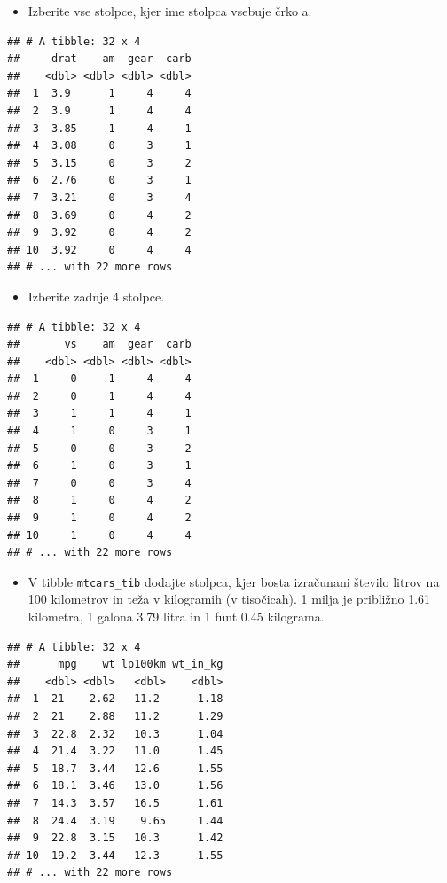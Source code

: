 \documentclass[
]{book}
\providecommand{\tightlist}{%
  \setlength{\itemsep}{0pt}\setlength{\parskip}{0pt}}
\begin{document}
\begin{enumerate}
  \begin{itemize}
  \tightlist
  \item
    Izberite vse stolpce, kjer ime stolpca vsebuje črko a.
  \end{itemize}

\begin{verbatim}
## # A tibble: 32 x 4
##     drat    am  gear  carb
##    <dbl> <dbl> <dbl> <dbl>
##  1  3.9      1     4     4
##  2  3.9      1     4     4
##  3  3.85     1     4     1
##  4  3.08     0     3     1
##  5  3.15     0     3     2
##  6  2.76     0     3     1
##  7  3.21     0     3     4
##  8  3.69     0     4     2
##  9  3.92     0     4     2
## 10  3.92     0     4     4
## # ... with 22 more rows
\end{verbatim}

  \begin{itemize}
  \tightlist
  \item
    Izberite zadnje 4 stolpce.
  \end{itemize}

\begin{verbatim}
## # A tibble: 32 x 4
##       vs    am  gear  carb
##    <dbl> <dbl> <dbl> <dbl>
##  1     0     1     4     4
##  2     0     1     4     4
##  3     1     1     4     1
##  4     1     0     3     1
##  5     0     0     3     2
##  6     1     0     3     1
##  7     0     0     3     4
##  8     1     0     4     2
##  9     1     0     4     2
## 10     1     0     4     4
## # ... with 22 more rows
\end{verbatim}

  \begin{itemize}
  \tightlist
  \item
    V tibble \texttt{mtcars\_tib} dodajte stolpca, kjer bosta izračunani število litrov na 100 kilometrov in teža v kilogramih (v tisočicah). 1 milja je približno 1.61 kilometra, 1 galona 3.79 litra in 1 funt 0.45 kilograma.
  \end{itemize}

\begin{verbatim}
## # A tibble: 32 x 4
##      mpg    wt lp100km wt_in_kg
##    <dbl> <dbl>   <dbl>    <dbl>
##  1  21    2.62   11.2      1.18
##  2  21    2.88   11.2      1.29
##  3  22.8  2.32   10.3      1.04
##  4  21.4  3.22   11.0      1.45
##  5  18.7  3.44   12.6      1.55
##  6  18.1  3.46   13.0      1.56
##  7  14.3  3.57   16.5      1.61
##  8  24.4  3.19    9.65     1.44
##  9  22.8  3.15   10.3      1.42
## 10  19.2  3.44   12.3      1.55
## # ... with 22 more rows
\end{verbatim}


\end{enumerate}
\end{document}
